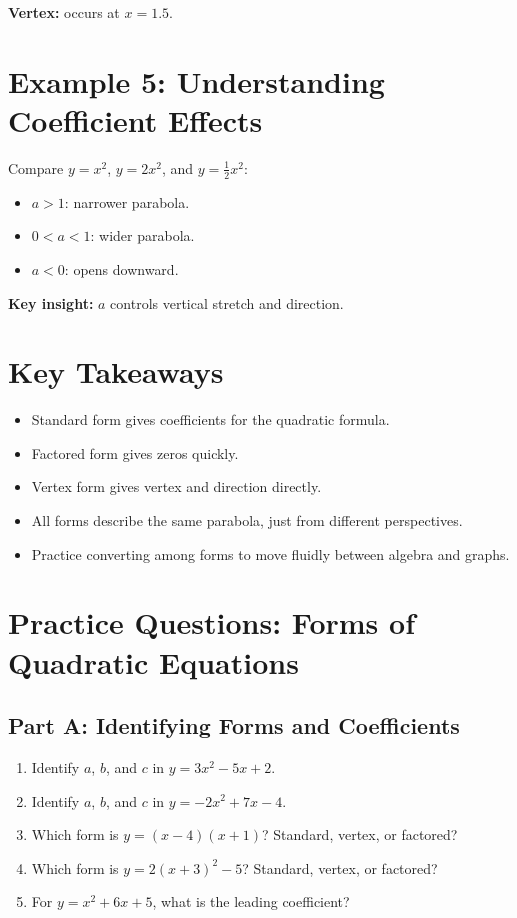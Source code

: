 \documentclass[12pt]{article}
\begin{document}
\textbf{Vertex:} occurs at \(x = 1.5\).

\section*{Example 5: Understanding Coefficient Effects}

Compare \(y = x^2\), \(y = 2x^2\), and \(y = \frac{1}{2}x^2\):
\begin{itemize}
  \item \(a > 1\): narrower parabola.
  \item \(0 < a < 1\): wider parabola.
  \item \(a < 0\): opens downward.
\end{itemize}

\textbf{Key insight:} \(a\) controls vertical stretch and direction.

\section*{Key Takeaways}
\begin{itemize}
  \item Standard form gives coefficients for the quadratic formula.
  \item Factored form gives zeros quickly.
  \item Vertex form gives vertex and direction directly.
  \item All forms describe the same parabola, just from different perspectives.
  \item Practice converting among forms to move fluidly between algebra and graphs.
\end{itemize}

\newpage


\section*{Practice Questions: Forms of Quadratic Equations}

\subsection*{Part A: Identifying Forms and Coefficients}
\begin{enumerate}
  \item Identify \(a\), \(b\), and \(c\) in \(y = 3x^2 - 5x + 2.\)
  \item Identify \(a\), \(b\), and \(c\) in \(y = -2x^2 + 7x - 4.\)
  \item Which form is \(y = (x - 4)(x + 1)\)? Standard, vertex, or factored?
  \item Which form is \(y = 2(x + 3)^2 - 5\)? Standard, vertex, or factored?
  \item For \(y = x^2 + 6x + 5\), what is the leading coefficient?
\end{enumerate}
\end{document}
